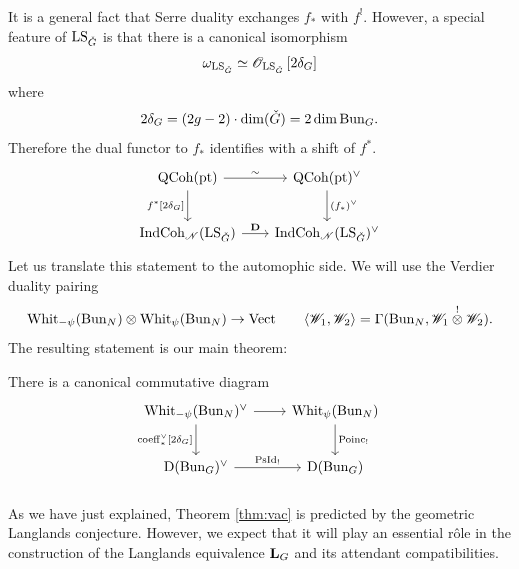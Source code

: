 \subsubsection{} It is a general fact that Serre duality exchanges $f_*$ with $f^!$. However, a special feature of $\mathrm{LS}_{\check{G}}$ is that there is a canonical isomorphism
    \[\omega_{\mathrm{LS}_{\check{G}}} \simeq \mathscr{O}_{\mathrm{LS}_{\check{G}}} \, [2 \delta_G]\]
where
    \[2 \delta_G = (2g - 2) \cdot \dim({\check{G}}) = 2 \dim \mathrm{Bun}_G.\]
Therefore the dual functor to $f_*$ identifies with a shift of $f^*$.
\[
\begin{tikzcd}[
  column sep={10em,between origins},
  row sep={4em,between origins}
]
    \QCoh(\pt) \arrow[r, "\sim"] \arrow[d, "f^*{[2 \delta_G]}" left] & \QCoh(\pt)^\vee \arrow[d, "(f_*)^\vee"] \\ 
    \ICoh_\Nilp(\LS_\LG) \arrow[r, "\DD"] & \ICoh_\Nilp(\LS_\LG)^\vee
\end{tikzcd}
\]
Let us translate this statement to the automophic side. We will use the Verdier duality pairing
    \[
    \mathrm{Whit}_{-\psi}(\mathrm{Bun}_N) \otimes \mathrm{Whit}_\psi(\mathrm{Bun}_N) \to \mathrm{Vect}
    \qquad
    \langle \mathscr{W}_1, \mathscr{W}_2 \rangle = \Gamma(\mathrm{Bun}_N, \mathscr{W}_1 \overset{!}{\otimes} \mathscr{W}_2).
    \]
The resulting statement is our main theorem:

\begin{theorem}
There is a canonical commutative diagram
\[
\label{thm:vac}
\begin{tikzcd}[
  column sep={10em,between origins},
  row sep={4em,between origins}
]
    \Whit_{-\psi}(\Bun_N)^\vee \arrow[d, "\coeff_*^\vee {[2 \delta_G]}" left] \arrow[r] & \Whit_\psi(\Bun_N) \arrow[d, "\Poinc_!"] \\
    \DMod(\Bun_G)^\vee \arrow[r, "\PsId_!"] & \DMod(\Bun_G)
\end{tikzcd}
\]
\end{theorem}

\subsubsection{} As we have just explained, Theorem \ref{thm:vac} is predicted by the geometric Langlands conjecture. However, we expect that it will play an essential r\^ole in the construction of the Langlands equivalence $\mathbf{L}_G$ and its attendant compatibilities. 

